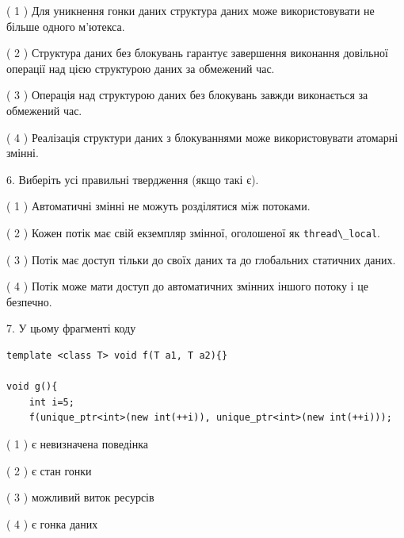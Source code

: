\documentclass[12pt, ukrainian]{article}
\def\code#1{\Verb!#1!}
\begin{document}
\begin {large}
{( 1 ) Для уникнення гонки даних структура даних може використовувати не більше одного м’ютекса.%

( 2 ) Структура даних без блокувань гарантує завершення виконання довільної операції над цією структурою даних за обмежений час.%

( 3 ) Операція над структурою даних без блокувань завжди виконається за обмежений час.%

( 4 ) Реалізація структури даних з блокуваннями може використовувати атомарні змінні.%
\newpage



\vspace{5mm}
6. Виберіть усі правильні твердження (якщо такі є).\par
\vspace{2mm}

( 1 ) Автоматичні змінні не можуть розділятися між потоками.%

( 2 ) Кожен потік має свій екземпляр змінної, оголошеної як \code{thread\_local}.%

( 3 ) Потік має доступ тільки до своїх даних та до глобальних статичних даних.%

( 4 ) Потік може мати доступ до автоматичних змінних іншого потоку і це безпечно.%


\vspace{5mm}
7. У цьому фрагменті коду
\begin{verbatim}
template <class T> void f(T a1, T a2){}

void g(){
    int i=5;
    f(unique_ptr<int>(new int(++i)), unique_ptr<int>(new int(++i)));
\end{verbatim}

( 1 ) є невизначена поведінка%

( 2 ) є стан гонки%

( 3 ) можливий виток ресурсів%

( 4 ) є гонка даних%
}
\end {large}
\end{document}
